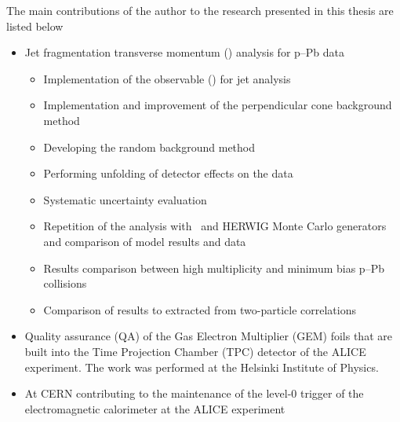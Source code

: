 
The main contributions of the author to the research presented in this thesis are listed below
\begin{itemize}
\renewcommand\labelitemi{--}

\item Jet fragmentation transverse momentum (\jt{}) analysis for   p--Pb data
\begin{itemize}
\item Implementation of the observable (\jt{}) for jet analysis
\item Implementation and improvement of the perpendicular cone background method
\item Developing the random background method
\item Performing unfolding of detector effects on the data
\item Systematic uncertainty evaluation
\item Repetition of the analysis with \pythia~and HERWIG Monte Carlo generators and comparison of model results and data
\item Results comparison between high multiplicity and minimum bias p--Pb collisions
\item Comparison of results to \jt{} extracted from two-particle correlations
\end{itemize}
\item Quality assurance (QA) of the Gas Electron Multiplier (GEM) foils that are built into the Time Projection Chamber (TPC) detector of the ALICE experiment. The work was performed at the Helsinki Institute of Physics.
\item At CERN contributing to the maintenance of the level-0 trigger of the electromagnetic calorimeter at the ALICE experiment
\end{itemize} 


\newpage
\thispagestyle{empty}

\vspace*{25mm} 

